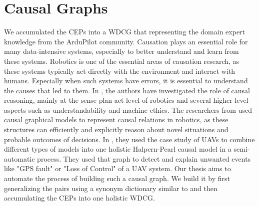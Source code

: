 \section{Causal Graphs}\label{sec:causal-graphs}
We accumulated the \ac{CEP}s into a \ac{WDCG} that representing the domain expert knowledge from the ArduPilot community.
Causation plays an essential role for many data-intensive systems, especially to better understand and learn from these systems.
Robotics is one of the essential areas of causation research, as these systems typically act directly with the environment and interact with humans.
Especially when such systems have errors, it is essential to understand the causes that led to them.
In \cite{hellstrom2021relevance}, the authors have investigated the role of causal reasoning, mainly at the sense-plan-act level of robotics and several higher-level aspects such as understandability and machine ethics.
The researchers from \cite{stocking2022robot} used causal graphical models to represent causal relations in robotics, as these structures can efficiently and explicitly reason about novel situations and probable outcomes of decisions.
In \cite{ibrahim2019practical}, they used the case study of \ac{UAV}s to combine different types of models into one holistic Halpern-Pearl causal model in a semi-automatic process.
They used that graph to detect and explain unwanted events like "GPS fault" or "Loss of Control" of a \ac{UAV} system.
Our thesis aims to automate the process of building such a causal graph.
We build it by first generalizing the pairs using a synonym dictionary similar to \cite{Hassanzadeh19} and then accumulating the \ac{CEP}s into one holistic \ac{WDCG}.
